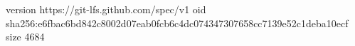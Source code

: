 version https://git-lfs.github.com/spec/v1
oid sha256:e6fbac6bd842c8002d07eab0fcb6c4dc074347307658cc7139e52c1deba10ecf
size 4684
